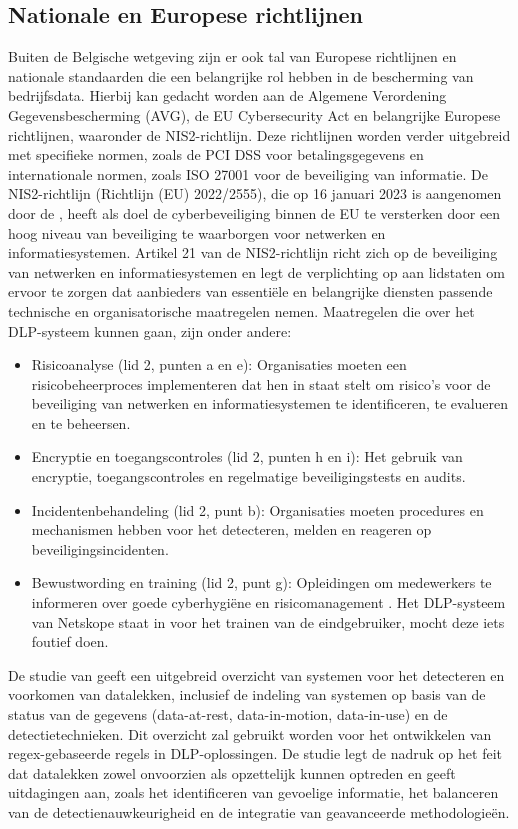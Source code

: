 \subsection{Nationale en Europese richtlijnen}%

Buiten de Belgische wetgeving zijn er ook tal van Europese richtlijnen en nationale standaarden die een belangrijke rol hebben in de bescherming van bedrijfsdata. 
Hierbij kan gedacht worden aan de Algemene Verordening Gegevensbescherming (AVG), de EU Cybersecurity Act en belangrijke Europese richtlijnen, waaronder de NIS2-richtlijn. 
Deze richtlijnen worden verder uitgebreid met specifieke normen, zoals de PCI DSS voor betalingsgegevens en internationale normen, zoals ISO 27001 voor de beveiliging van informatie. 
De NIS2-richtlijn (Richtlijn (EU) 2022/2555), die op 16 januari 2023 is aangenomen door de \textcite{nis2directive}, 
heeft als doel de cyberbeveiliging binnen de EU te versterken door een hoog niveau van beveiliging te waarborgen voor netwerken en informatiesystemen. 
Artikel 21 van de NIS2-richtlijn richt zich op de beveiliging van netwerken en informatiesystemen en legt de verplichting op aan lidstaten om 
ervoor te zorgen dat aanbieders van essentiële en belangrijke diensten passende technische en organisatorische maatregelen nemen. 
Maatregelen die over het DLP-systeem kunnen gaan, zijn onder andere: 

\begin{itemize}
    \item Risicoanalyse (lid 2, punten a en e): Organisaties moeten een risicobeheerproces implementeren dat hen in staat stelt om risico's voor de beveiliging van netwerken en informatiesystemen te identificeren, te evalueren en te beheersen.
    \item Encryptie en toegangscontroles (lid 2, punten h en i): Het gebruik van encryptie, toegangscontroles en regelmatige beveiligingstests en audits.
    \item Incidentenbehandeling (lid 2, punt b): Organisaties moeten procedures en mechanismen hebben voor het detecteren, melden en reageren op beveiligingsincidenten.
    \item Bewustwording en training (lid 2, punt g): Opleidingen om medewerkers te informeren over goede cyberhygiëne en risicomanagement \autocite{nis2directive}. Het DLP-systeem van Netskope staat in voor het trainen van de eindgebruiker, mocht deze iets foutief doen.
\end{itemize}

De studie van \textcite{Nayak2020} geeft een uitgebreid overzicht van systemen voor het detecteren en voorkomen van datalekken, 
inclusief de indeling van systemen op basis van de status van de gegevens (data-at-rest, data-in-motion, dat\-a-in-use) en de detectietechnieken. 
Dit overzicht zal gebruikt worden voor het ontwikkelen van regex-gebaseerde regels in DLP-oploss\-ingen. 
De studie legt de nadruk op het feit dat datalekken zowel onvoorzien als opzettelijk kunnen optreden en geeft uitdagingen aan, 
zoals het identificeren van gevoelige informatie, het balanceren van de detectienauwkeurigheid en de integratie van geavanceerde methodologieën.

